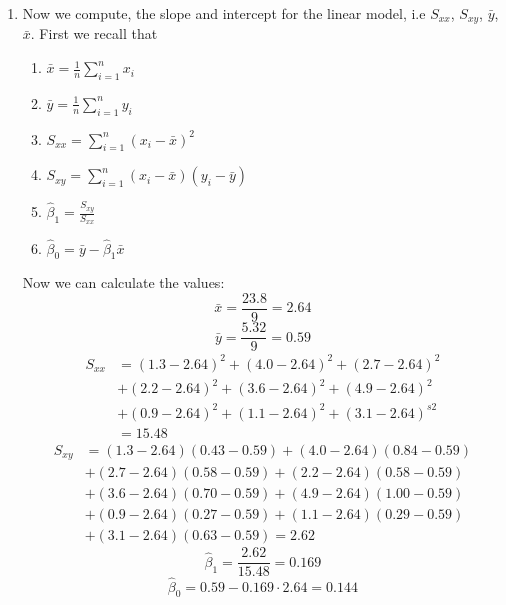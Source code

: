 \documentclass[12pt]{article}
\begin{document}
\begin{enumerate}[1.]
\begin{enumerate}
            \item Now we compute, the slope and intercept for the linear model, i.e $S_{xx}$, $S_{xy}$, 
            $\bar{y}$, $\bar{x}$.
            First we recall that
            \begin{enumerate}
                \item $\bar{x} = \frac{1}{n} \sum_{i=1}^{n} x_i$
                \item $\bar{y} = \frac{1}{n} \sum_{i=1}^{n} y_i$
                \item $S_{xx} = \sum_{i=1}^{n} (x_i - \bar{x})^2$
                \item $S_{xy} = \sum_{i=1}^{n} (x_i - \bar{x})(y_i - \bar{y})$
                \item $\hat{\beta}_1 = \frac{S_{xy}}{S_{xx}}$
                \item $\hat{\beta}_0 = \bar{y} - \hat{\beta}_1 \bar{x}$
            \end{enumerate}
            Now we can calculate the values:
            \[ \bar{x} = \frac{23.8}{9} = 2.64 \]
            \[\bar{y} = \frac{5.32}{9} = 0.59 \]
            \begin{align*}
                S_{xx} &= (1.3-2.64)^{2}+(4.0-2.64)^{2}+(2.7-2.64)^{2}\\
                &+(2.2-2.64)^{2}+(3.6-2.64)^{2}+(4.9-2.64)^{2}\\
                &+(0.9-2.64)^{2}+(1.1-2.64)^{2}+(3.1-2.64)^{s2} \\
                &= 15.48
            \end{align*}
            \begin{align*}
                S_{xy} &= (1.3-2.64)(0.43-0.59)+(4.0-2.64)(0.84-0.59)\\
                &+(2.7-2.64)(0.58-0.59)+(2.2-2.64)(0.58-0.59)\\
                &+(3.6-2.64)(0.70-0.59)+(4.9-2.64)(1.00-0.59)\\
                &+(0.9-2.64)(0.27-0.59)+(1.1-2.64)(0.29-0.59)\\
                &+(3.1-2.64)(0.63-0.59) = 2.62
            \end{align*}
            \[ \hat{\beta}_1 = \frac{2.62}{15.48} = 0.169\]
            \[ \hat{\beta}_0 = 0.59 - 0.169 \cdot 2.64 = 0.144\]


\end{enumerate}
\end{enumerate}
\end{document}
